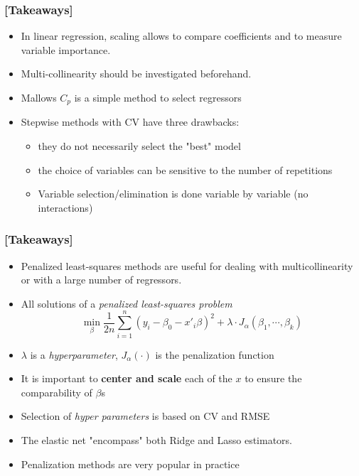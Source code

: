 \documentclass[xcolor=x11names,compress, aspectratio=169]{beamer}
\renewcommand{\(}{\begin{columns}}
\renewcommand{\)}{\end{columns}}
\newcommand{\<}[1]{\begin{column}{#1}}
\renewcommand{\>}{\end{column}}
\begin{document}
\begin{frame} %
\frametitle{\textcolor{brique}{[Takeaways]}}
\begin{itemize}[<+->]
\item In linear regression, scaling allows to compare coefficients and to measure variable importance.
\item Multi-collinearity should be investigated beforehand.
\item Mallows $C_p$ is a simple method to select regressors
\item Stepwise methods with CV have three drawbacks:
    \begin{itemize}
        \item they do not necessarily select the "best" model
        \item the choice of variables can be sensitive to the number of repetitions
        \item Variable selection/elimination is done variable by variable (no interactions)
    \end{itemize}
\end{itemize}
\end{frame}


\begin{frame} %
\frametitle{\textcolor{brique}{[Takeaways]}}
\begin{itemize}[<+->]
\item Penalized least-squares methods are useful for dealing with multicollinearity or with a large number of regressors.
\item All solutions of a \textit{penalized least-squares problem}$$
\min_{\beta} \frac{1}{2n}
     \sum_{i=1}^{n}{ \left( y_i - \beta_0 - x'_i\beta\right)^{2} } +
\lambda \cdot J_{\alpha}(\beta_1, \cdots, \beta_k)
$$
\item[] $\lambda$ is a \textit{hyperparameter}, $J_{\alpha}(\cdot)$ is the penalization function
\item It is important to \textbf{center and scale}  each of the $x$ to ensure the comparability of $\beta$s
\item  Selection of \textit{hyper parameters} is based on CV and RMSE
\item The elastic net "encompass" both Ridge and Lasso estimators.
\item Penalization methods are very popular in practice
\end{itemize}
\end{frame}
\end{document}
